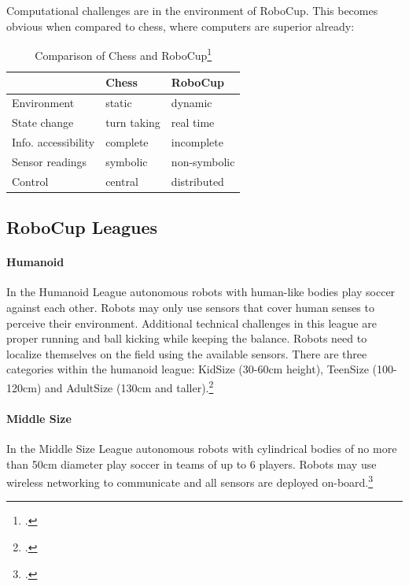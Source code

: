 Computational challenges are in the environment of RoboCup. This becomes
obvious when compared to chess, where computers are superior already:

\begin{table}[htbp]
\centering
\begin{savenotes}
\begin{tabular*}{0.7\textwidth}{p{} p{} p{}}
\toprule
                    &\textbf{Chess} & \textbf{RoboCup} \\
\midrule 
Environment         & static		& dynamic \\
State change        & turn taking   & real time \\
Info. accessibility & complete      & incomplete \\
Sensor readings     & symbolic      & non-symbolic \\
Control             & central       & distributed \\
\bottomrule 
\end{tabular*}
  \caption[Comparison of Chess and RoboCup]{Comparison of Chess and RoboCup\footcite[][]{robo_objectives}}
  \label{tab:chess_comparison}
\end{savenotes}
\end{table}

\subsection{RoboCup Leagues \label{sec:robo-leagues}}


\paragraph{Humanoid}
In the Humanoid League autonomous robots with human-like bodies play soccer
against each other.
Robots may only use sensors that cover human senses to perceive their
environment. Additional technical challenges in this league are proper running and ball
kicking while keeping the balance. Robots need to localize themselves on the
field using the available sensors.
There are three categories within the humanoid league: KidSize (30-60cm height),
TeenSize (100-120cm) and AdultSize (130cm and taller).\footcite[Cf.][]{robo_humanoid_wiki}
 
\paragraph{Middle Size}
In the Middle Size League autonomous robots with cylindrical bodies of no more
than 50cm diameter play soccer in teams of up to 6 players. Robots may use
wireless networking to communicate and all sensors are deployed on-board.\footcite[Cf.][]{robo_ms}
 
